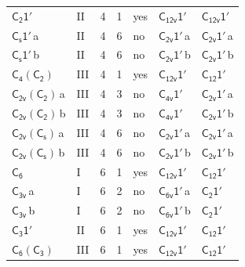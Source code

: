 \documentclass[10pt,a4paper]{article}
\numberwithin{equation}{section}
\newcommand{\grp}[1]{\mathsf{#1}}
\newcommand{\clsletter}[1]{\,{\scriptsize\color{black!55}#1}}
\begin{document}
{\begin{longtable}{@{}llrrlll@{}}
\href{C2-1p.pdf}{$\grp{C_{2}1'}$} & II & 4 & 1 & yes & \href{C12v-1p.pdf}{$\grp{C_{12v}1'}$} & \href{C12v-1p.pdf}{$\grp{C_{12v}1'}$}\\
\href{C1v-1p.pdf}{$\grp{C_{s}1'}$}\clsletter{a} & II & 4 & 6 & no & \href{C2v-1p.pdf}{$\grp{C_{2v}1'}$}\clsletter{a} & \href{C2v-1p.pdf}{$\grp{C_{2v}1'}$}\clsletter{a}\\
\href{C1v-1p.pdf}{$\grp{C_{s}1'}$}\clsletter{b} & II & 4 & 6 & no & \href{C2v-1p.pdf}{$\grp{C_{2v}1'}$}\clsletter{b} & \href{C2v-1p.pdf}{$\grp{C_{2v}1'}$}\clsletter{b}\\
\href{C4-C2.pdf}{$\grp{C_{4}}(\grp{C_{2}})$} & III & 4 & 1 & yes & \href{C12v-1p.pdf}{$\grp{C_{12v}1'}$} & \href{C12-1p.pdf}{$\grp{C_{12}1'}$}\\
\href{C2v-C2.pdf}{$\grp{C_{2v}}(\grp{C_{2}})$}\clsletter{a} & III & 4 & 3 & no & \href{C4v-1p.pdf}{$\grp{C_{4v}1'}$} & \href{C2v-1p.pdf}{$\grp{C_{2v}1'}$}\clsletter{a}\\
\href{C2v-C2.pdf}{$\grp{C_{2v}}(\grp{C_{2}})$}\clsletter{b} & III & 4 & 3 & no & \href{C4v-1p.pdf}{$\grp{C_{4v}1'}$} & \href{C2v-1p.pdf}{$\grp{C_{2v}1'}$}\clsletter{b}\\
\href{C2v-C1v.pdf}{$\grp{C_{2v}}(\grp{C_{s}})$}\clsletter{a} & III & 4 & 6 & no & \href{C2v-1p.pdf}{$\grp{C_{2v}1'}$}\clsletter{a} & \href{C2v-1p.pdf}{$\grp{C_{2v}1'}$}\clsletter{a}\\
\href{C2v-C1v.pdf}{$\grp{C_{2v}}(\grp{C_{s}})$}\clsletter{b} & III & 4 & 6 & no & \href{C2v-1p.pdf}{$\grp{C_{2v}1'}$}\clsletter{b} & \href{C2v-1p.pdf}{$\grp{C_{2v}1'}$}\clsletter{b}\\
\href{../../../rotation/data/pdf/C6.pdf}{$\grp{C_{6}}$} & I & 6 & 1 & yes & \href{C12v-1p.pdf}{$\grp{C_{12v}1'}$} & \href{C12-1p.pdf}{$\grp{C_{12}1'}$}\\
\href{../../../rotation/data/pdf/C3v.pdf}{$\grp{C_{3v}}$}\clsletter{a} & I & 6 & 2 & no & \href{C6v-1p.pdf}{$\grp{C_{6v}1'}$}\clsletter{a} & \href{C2-1p.pdf}{$\grp{C_{2}1'}$}\\
\href{../../../rotation/data/pdf/C3v.pdf}{$\grp{C_{3v}}$}\clsletter{b} & I & 6 & 2 & no & \href{C6v-1p.pdf}{$\grp{C_{6v}1'}$}\clsletter{b} & \href{C2-1p.pdf}{$\grp{C_{2}1'}$}\\
\href{C3-1p.pdf}{$\grp{C_{3}1'}$} & II & 6 & 1 & yes & \href{C12v-1p.pdf}{$\grp{C_{12v}1'}$} & \href{C12-1p.pdf}{$\grp{C_{12}1'}$}\\
\href{C6-C3.pdf}{$\grp{C_{6}}(\grp{C_{3}})$} & III & 6 & 1 & yes & \href{C12v-1p.pdf}{$\grp{C_{12v}1'}$} & \href{C12-1p.pdf}{$\grp{C_{12}1'}$}\\

\end{longtable}}
\end{document}
